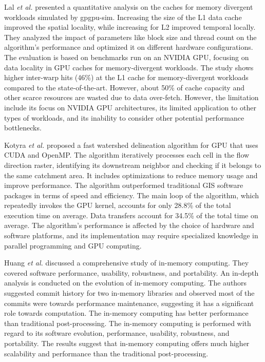 \documentclass[journal, a4paper]{IEEEtran}
\begin{document}
	Lal \textit{et al.} \cite{10.1007/978-3-030-60939-9_16} presented a quantitative analysis on the caches for memory divergent workloads simulated by gpgpu-sim. Increasing the size of the L1 data cache improved the spatial locality, while increasing for L2 improved temporal locally. They analyzed the impact of parameters like block size and thread count on the algorithm's performance and optimized it on different hardware configurations. The evaluation is based on benchmarks run on an NVIDIA GPU, focusing on data locality in GPU caches for memory-divergent workloads. The study shows higher inter-warp hits (46\%) at the L1 cache for memory-divergent workloads compared to the state-of-the-art. However, about 50\% of cache capacity and other scarce resources are wasted due to data over-fetch. However, the limitation include its focus on NVIDIA GPU architectures, its limited application to other types of workloads, and its inability to consider other potential performance bottlenecks.
	
	Kotyra \textit{et al.} \cite{KOTYRA2023105613} proposed a fast watershed delineation algorithm for GPU that uses CUDA and OpenMP. The algorithm iteratively processes each cell in the flow direction raster, identifying its downstream neighbor and checking if it belongs to the same catchment area. It includes optimizations to reduce memory usage and improve performance. The algorithm outperformed traditional GIS software packages in terms of speed and efficiency. The main loop of the algorithm, which repeatedly invokes the GPU kernel, accounts for only 28.8\% of the total execution time on average. Data transfers account for 34.5\% of the total time on average. The algorithm's performance is affected by the choice of hardware and software platforms, and its implementation may require specialized knowledge in parallel programming and GPU computing.
	
	Huang \textit{et al.} \cite{HUANG2022106} discussed a comprehensive study of in-memory computing.	They covered software performance, usability, robustness, and portability. An in-depth analysis is conducted on the evolution of in-memory computing. The authors suggested commit history for two in-memory libraries and observed most of the commits	were towards performance maintenance, suggesting it has a significant role towards computation. The in-memory computing has better performance than traditional post-processing. The in-memory computing is performed with regard to its software evolution, 	performance, usability, robustness, and portability. The results suggest that in-memory computing offers much higher scalability and performance than the traditional post-processing.
	
	
	
\end{document}
